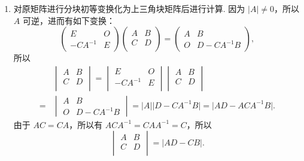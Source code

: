 \begin{enumerate}
    \item 对原矩阵进行分块初等变换化为上三角块矩阵后进行计算. 因为 $\lvert A \rvert \neq 0$，所以 $A$ 可逆，进而有如下变换：
          \[\begin{pmatrix}
                  E        & O \\
                  -CA^{-1} & E
              \end{pmatrix} \begin{pmatrix}
                  A & B \\
                  C & D \\
              \end{pmatrix} = \begin{pmatrix}
                  A & B          \\
                  O & D-CA^{-1}B
              \end{pmatrix},\]
          所以
          \begin{align*}
                  & \begin{vmatrix}
                        A & B \\
                        C & D \\
                    \end{vmatrix}
              = \begin{vmatrix}
                    E        & O \\
                    -CA^{-1} & E \\
                \end{vmatrix}
              \begin{vmatrix}
                  A & B \\
                  C & D \\
              \end{vmatrix}       \\
              ={} & \begin{vmatrix}
                        A & B          \\
                        O & D-CA^{-1}B
                    \end{vmatrix}
              = \lvert A \rvert \lvert D-CA^{-1}B \rvert = \lvert AD-ACA^{-1}B \rvert.
          \end{align*} 由于 $AC = CA$，所以有 $ACA^{-1} = CAA^{-1} = C$，所以
          \[\begin{vmatrix}
                  A & B \\
                  C & D \\
              \end{vmatrix} = \lvert AD-CB \rvert.\]


\end{enumerate}
